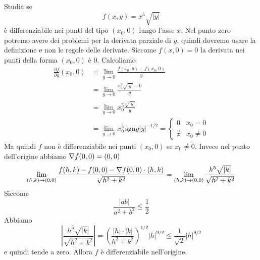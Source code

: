 \documentclass[a4paper]{article}
\begin{document}
%

\begin{radioactive}
\begin{snippetexample}{}
    Studia se \[
        f(x,y) = x^5 \sqrt{|y|}
    \]
    è differenziabile nei punti del tipo \((x_0, 0)\) lungo l'asse \(x\).
    Nel punto zero potremo avere dei problemi per la derivata parziale di \(y\),
    quindi dovremo usare la definizione e non le regole delle derivate.
    Siccome \(f(x,0) = 0\) la derivata nei punti della forma \((x_0, 0)\) è 0.
    Calcoliamo
    \begin{align*}
        \frac{\partial f}{\partial y}(x_0, 0)
        &= \lim_{y \to 0} \frac{f(x_0, y) - f(x_0, 0)}{y} \\
        &= \lim_{y\to 0} \frac{x_0^5 \sqrt{|y|} - 0}{y} \\
        &= \lim_{y\to 0} x_0^5 \frac{\sqrt{|y|}}{y} \\
        &= \lim_{y\to 0} x_0^5 \,\text{sgn} y |y|^{-1/2} = \begin{cases}
            0 & x_0 = 0 \\
            \nexists & x_0 \neq 0
        \end{cases}
    \end{align*}
    Ma quindi \(f\) non è differenziabile nei punti \((x_0, 0)\) se \(x_0 \neq 0\).
    Invece nel punto dell'origine abbiamo \(\nabla f(0,0) = (0,0)\)
    \begin{align*}
        \lim_{(h,k) \to (0,0)} \frac{f(h,k) - f(0,0) - \nabla f(0,0) \cdot (h,k)}{\sqrt{h^2 + k^2}}
        &= \lim_{(h,k) \to (0,0)} \frac{h^5 \sqrt{|k|}}{\sqrt{h^2 + k^2}} \\
    \end{align*}
    Siccome \[
        \frac{|ab|}{a^2 + b^2} \leq \frac{1}{2}
    \]
    Abbiamo
    \[
        \left|\frac{h^5 \sqrt{|k|}}{\sqrt{h^2 + k^2}}\right|
        = {\left(
            \frac{|h| \cdot |k|}{h^2 + k^2}
        \right)}^{1/2} {|h|}^{9/2} \leq \frac{1}{\sqrt{2}} {|h|}^{9/2}
    \]
    e quindi tende a zero. Allora \(f\) è differenziabile nell'origine.
\end{snippetexample}
\end{radioactive}
\end{document}
